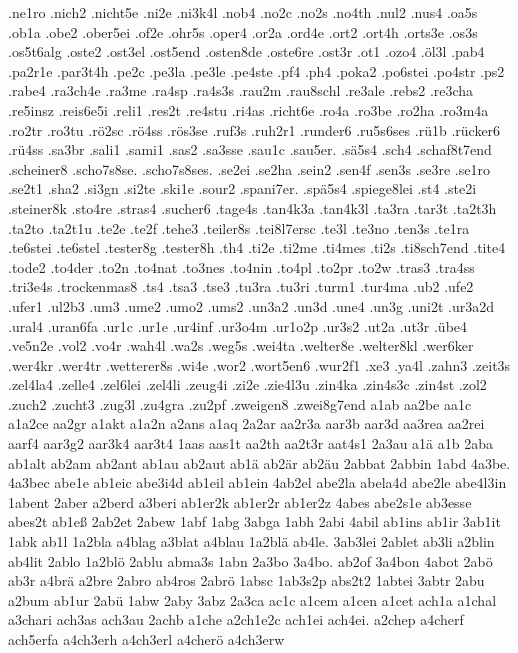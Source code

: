 {.ne1ro
.nich2
.nicht5e
.ni2e
.ni3k4l
.nob4
.no2c
.no2s
.no4th
.nul2
.nus4
.oa5s
.ob1a
.obe2
.ober5ei
.of2e
.ohr5s
.oper4
.or2a
.ord4e
.ort2
.ort4h
.orts3e
.os3s
.os5t6alg
.oste2
.ost3el
.ost5end
.osten8de
.oste6re
.ost3r
.ot1
.ozo4
.öl3l
.pab4
.pa2r1e
.par3t4h
.pe2c
.pe3la
.pe3le
.pe4ste
.pf4
.ph4
.poka2
.po6stei
.po4str
.ps2
.rabe4
.ra3ch4e
.ra3me
.ra4sp
.ra4s3s
.rau2m
.rau8schl
.re3ale
.rebs2
.re3cha
.re5insz
.reis6e5i
.reli1
.res2t
.re4stu
.ri4as
.richt6e
.ro4a
.ro3be
.ro2ha
.ro3m4a
.ro2tr
.ro3tu
.rö2sc
.rö4ss
.rös3se
.ruf3s
.ruh2r1
.runder6
.ru5s6ses
.rü1b
.rücker6
.rü4ss
.sa3br
.sali1
.sami1
.sas2
.sa3sse
.sau1c
.sau5er.
.sä5s4
.sch4
.schaf8t7end
.scheiner8
.scho7s8se.
.scho7s8ses.
.se2ei
.se2ha
.sein2
.sen4f
.sen3s
.se3re
.se1ro
.se2t1
.sha2
.si3gn
.si2te
.ski1e
.sour2
.spani7er.
.spä5s4
.spiege8lei
.st4
.ste2i
.steiner8k
.sto4re
.stras4
.sucher6
.tage4s
.tan4k3a
.tan4k3l
.ta3ra
.tar3t
.ta2t3h
.ta2to
.ta2t1u
.te2e
.te2f
.tehe3
.teiler8s
.tei8l7ersc
.te3l
.te3no
.ten3s
.te1ra
.te6stei
.te6stel
.tester8g
.tester8h
.th4
.ti2e
.ti2me
.ti4mes
.ti2s
.ti8sch7end
.tite4
.tode2
.to4der
.to2n
.to4nat
.to3nes
.to4nin
.to4pl
.to2pr
.to2w
.tras3
.tra4ss
.tri3e4s
.trockenmas8
.ts4
.tsa3
.tse3
.tu3ra
.tu3ri
.turm1
.tur4ma
.ub2
.ufe2
.ufer1
.ul2b3
.um3
.ume2
.umo2
.ums2
.un3a2
.un3d
.une4
.un3g
.uni2t
.ur3a2d
.ural4
.uran6fa
.ur1c
.ur1e
.ur4inf
.ur3o4m
.ur1o2p
.ur3s2
.ut2a
.ut3r
.übe4
.ve5n2e
.vol2
.vo4r
.wah4l
.wa2s
.weg5s
.wei4ta
.welter8e
.welter8kl
.wer6ker
.wer4kr
.wer4tr
.wetterer8s
.wi4e
.wor2
.wort5en6
.wur2f1
.xe3
.ya4l
.zahn3
.zeit3s
.zel4la4
.zelle4
.zel6lei
.zel4li
.zeug4i
.zi2e
.zie4l3u
.zin4ka
.zin4s3c
.zin4st
.zol2
.zuch2
.zucht3
.zug3l
.zu4gra
.zu2pf
.zweigen8
.zwei8g7end
a1ab
aa2be
aa1c
a1a2ce
aa2gr
a1akt
a1a2n
a2ans
a1aq
2a2ar
aa2r3a
aar3b
aar3d
aa3rea
aa2rei
aarf4
aar3g2
aar3k4
aar3t4
1aas
aas1t
aa2th
aa2t3r
aat4s1
2a3au
a1ä
a1b
2aba
ab1alt
ab2am
ab2ant
ab1au
ab2aut
ab1ä
ab2är
ab2äu
2abbat
2abbin
1abd
4a3be.
4a3bec
abe1e
ab1eic
abe3i4d
ab1eil
ab1ein
4ab2el
abe2la
abela4d
abe2le
abe4l3in
1abent
2aber
a2berd
a3beri
ab1er2k
ab1er2r
ab1er2z
4abes
abe2s1e
ab3esse
abes2t
ab1eß
2ab2et
2abew
1abf
1abg
3abga
1abh
2abi
4abil
ab1ins
ab1ir
3ab1it
1abk
ab1l
1a2bla
a4blag
a3blat
a4blau
1a2blä
ab4le.
3ab3lei
2ablet
ab3li
a2blin
ab4lit
2ablo
1a2blö
2ablu
abma3s
1abn
2a3bo
3a4bo.
ab2of
3a4bon
4abot
2abö
ab3r
a4brä
a2bre
2abro
ab4ros
2abrö
1absc
1ab3s2p
abs2t2
1abtei
3abtr
2abu
a2bum
ab1ur
2abü
1abw
2aby
3abz
2a3ca
ac1c
a1cem
a1cen
a1cet
ach1a
a1chal
a3chari
ach3as
ach3au
2achb
a1che
a2ch1e2c
ach1ei
ach4ei.
a2chep
a4cherf
ach5erfa
a4ch3erh
a4ch3erl
a4cherö
a4ch3erw
}
